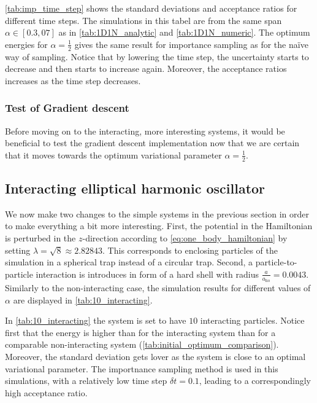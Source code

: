 \documentclass[
    a4paper, aps, twocolumn, floatfix, superscriptaddress, nofootinbib]{revtex4-1}
\newcommand{\1}{\mathds{1}}
\begin{document}
	\autoref{tab:imp_time_step} shows the standard deviations and acceptance ratios for different time steps. The
	simulations in this tabel are from the same span $\alpha \in [0.3, 07]$ as in \autoref{tab:1D1N_analytic} and
	\autoref{tab:1D1N_numeric}. The optimum energies for $\alpha = \frac{1}{2}$ gives the same result for importance
	sampling as for the naïve way of sampling. Notice that by lowering the time step, the uncertainty starts to decrease
	and then starts to increase again. Moreover, the acceptance ratios increases as the time step decreases.
	
	\subsubsection{Test of Gradient descent}
	
	Before moving on to the interacting, more interesting systems, it would be beneficial to test the gradient descent implementation
	now that we are certain that it moves towards the optimum variational parameter $\alpha = \frac{1}{2}$.

\subsection{Interacting elliptical harmonic oscillator}
         
		We now make two changes to the simple systems in the previous section in order to make everything
		a bit more interesting. First, the potential in the Hamiltonian is perturbed in the $z$-direction according to
		\autoref{eq:one_body_hamiltonian} by setting $\lambda = \sqrt{8} \approx 2.82843$. This corresponds to enclosing particles
		of the simulation in a spherical trap instead of a circular trap. Second, a particle-to-particle interaction is 
		introduces in form of a hard shell with radius $\frac{a}{a_\text{ho}} = 0.0043$. Similarly to the non-interacting
		case, the simulation results for different values of $\alpha$ are displayed in \autoref{tab:10_interacting}. 
         
		In \autoref{tab:10_interacting} the system is set to have $10$ interacting particles. Notice first that the energy is
		higher than for the interacting system than for a comparable non-interacting system (\autoref{tab:initial_optimum_comparison}).
		Moreover, the standard deviation gets lover as the system is close to an optimal variational parameter.  The importnance 
		sampling method is used in this simulations, with a relatively low time step $\delta t = 0.1$, leading to a correspondingly
		high acceptance ratio.  
         
\end{document}
